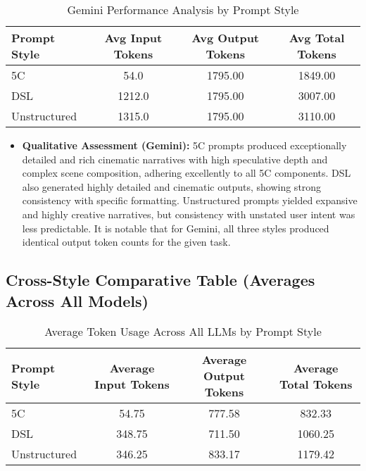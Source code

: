 \documentclass[10pt, a4paper]{article}
\begin{document}
\begin{table}[H]
    \centering
    \caption{Gemini Performance Analysis by Prompt Style}
    \label{tab:gemini_performance}
    \begin{tabular}{lccc}
        \toprule
        \textbf{Prompt Style} & \textbf{Avg Input Tokens} & \textbf{Avg Output Tokens} & \textbf{Avg Total Tokens} \\
        \midrule
        5C           & 54.0   & 1795.00 & 1849.00 \\
        DSL          & 1212.0 & 1795.00 & 3007.00 \\
        Unstructured & 1315.0 & 1795.00 & 3110.00 \\
        \bottomrule
    \end{tabular}
    \begin{itemize}
        \item \textbf{Qualitative Assessment (Gemini):} 5C prompts produced exceptionally detailed and rich cinematic narratives with high speculative depth and complex scene composition, adhering excellently to all 5C components. DSL also generated highly detailed and cinematic outputs, showing strong consistency with specific formatting. Unstructured prompts yielded expansive and highly creative narratives, but consistency with unstated user intent was less predictable. It is notable that for Gemini, all three styles produced identical output token counts for the given task.
    \end{itemize}
\end{table}

\subsection{Cross-Style Comparative Table (Averages Across All Models)}

\begin{table}[H]
    \centering
    \caption{Average Token Usage Across All LLMs by Prompt Style}
    \label{tab:cross_style_averages}
    \begin{tabular}{lccc}
        \toprule
        \textbf{Prompt Style} & \textbf{Average Input Tokens} & \textbf{Average Output Tokens} & \textbf{Average Total Tokens} \\
        \midrule
        5C           & 54.75 & 777.58 & 832.33 \\
        DSL          & 348.75 & 711.50 & 1060.25 \\
        Unstructured & 346.25 & 833.17 & 1179.42 \\
        \bottomrule
    \end{tabular}
\end{table}
\end{document}

